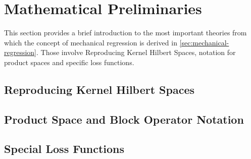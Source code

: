 \section{Mathematical Preliminaries}
\label{sec:preliminaries}

This section provides a brief introduction to the most important theories from which the concept of mechanical regression is derived in \cref{sec:mechanical-regression}.
Those involve Reproducing Kernel Hilbert Spaces, notation for product spaces and specific loss functions.

\subsection{Reproducing Kernel Hilbert Spaces}



%
%

\subsection{Product Space and Block Operator Notation}
\label{sec:block-operator-notation}



\subsection{Special Loss Functions}


%
